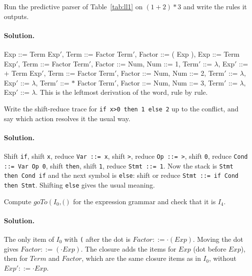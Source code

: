 \begin{exercise}
Run the predictive parser of Table~\ref{tab:ll1} on $(1+2)*3$ and write the
rules it outputs.
\end{exercise}

\paragraph{Solution.} Exp ::= Term Exp$'$, Term ::= Factor Term$'$,
Factor ::= ( Exp ), Exp ::= Term Exp$'$, Term ::= Factor Term$'$, Factor ::= Num,
Num ::= 1, Term$'$ ::= $\lambda$, Exp$'$ ::= $+$ Term Exp$'$, Term ::= Factor Term$'$,
Factor ::= Num, Num ::= 2, Term$'$ ::= $\lambda$, Exp$'$ ::= $\lambda$, Term$'$ ::= $*$
Factor Term$'$, Factor ::= Num, Num ::= 3, Term$'$ ::= $\lambda$, Exp$'$ ::= $\lambda$.
This is the leftmost derivation of the word, rule by rule.

\begin{exercise}
Write the shift-reduce trace for \texttt{if x>0 then 1 else 2} up to the
conflict, and say which action resolves it the usual way.
\end{exercise}

\paragraph{Solution.} Shift \texttt{if}, shift \texttt{x}, reduce
\texttt{Var ::= x}, shift \texttt{>}, reduce \texttt{Op ::= >}, shift \texttt{0},
reduce \texttt{Cond ::= Var Op 0}, shift \texttt{then}, shift \texttt{1}, reduce
\texttt{Stmt ::= 1}. Now the stack is \texttt{Stmt then Cond if} and the next
symbol is \texttt{else}: shift or reduce \texttt{Stmt ::= if Cond then Stmt}.
Shifting \texttt{else} gives the usual meaning.

\begin{exercise}
Compute $\mathit{goTo}(I_0, \texttt{(})$ for the expression grammar and check that
it is $I_4$.
\end{exercise}

\paragraph{Solution.} The only item of $I_0$ with \texttt{(} after the dot is
$\mathit{Factor} ::= \cdot(\mathit{Exp})$. Moving the dot gives
$\mathit{Factor} ::= (\cdot\mathit{Exp})$. The closure adds the items for
$\mathit{Exp}$ (dot before $\mathit{Exp}$), then for $\mathit{Term}$ and
$\mathit{Factor}$, which are the same closure items as in $I_0$, without
$\mathit{Exp'} ::= \cdot\mathit{Exp}$.
